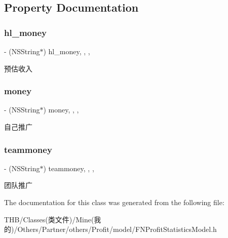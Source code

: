 \subsection{Property Documentation}
\mbox{\label{interface_p_stoday__yes_afd6af8b889b76c162d6ba72ea47d7a8e}} 
\subsubsection{\texorpdfstring{hl\+\_\+money}{hl\_money}}
{\footnotesize\ttfamily -\/ (N\+S\+String$\ast$) hl\+\_\+money\hspace{0.3cm}{\ttfamily [read]}, {\ttfamily [write]}, {\ttfamily [nonatomic]}, {\ttfamily [copy]}}

预估收入 \mbox{\label{interface_p_stoday__yes_a7e710deb44c57c1fa2c6d9e762d42726}} 
\subsubsection{\texorpdfstring{money}{money}}
{\footnotesize\ttfamily -\/ (N\+S\+String$\ast$) money\hspace{0.3cm}{\ttfamily [read]}, {\ttfamily [write]}, {\ttfamily [nonatomic]}, {\ttfamily [copy]}}

自己推广 \mbox{\label{interface_p_stoday__yes_a6b586a4ab8c9b299aadd74ada9f3921d}} 
\subsubsection{\texorpdfstring{teammoney}{teammoney}}
{\footnotesize\ttfamily -\/ (N\+S\+String$\ast$) teammoney\hspace{0.3cm}{\ttfamily [read]}, {\ttfamily [write]}, {\ttfamily [nonatomic]}, {\ttfamily [copy]}}

团队推广 

The documentation for this class was generated from the following file\+:\begin{DoxyCompactItemize}
\item 
T\+H\+B/\+Classes(类文件)/\+Mine(我的)/\+Others/\+Partner/others/\+Profit/model/F\+N\+Profit\+Statistics\+Model.\+h\end{DoxyCompactItemize}
